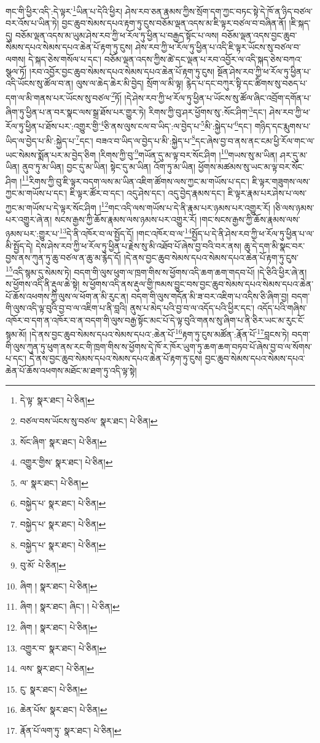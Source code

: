 གང་གི་ཕྱིར་འདི་:དེ་ལྟར་\footnote{དེ་ལྟ་  སྣར་ཐང་།  པེ་ཅིན། }ཡིན་པ་དེའི་ཕྱིར། ཤེས་རབ་ཅན་རྣམས་ཀྱིས་སྲོག་དག་ཀྱང་བཏང་སྟེ་དེ་ཁོ་ན་ཉིད་བཙལ་བར་འོས་པ་ཡིན་ཏེ། བྱང་ཆུབ་སེམས་དཔའ་རྟག་ཏུ་ངུས་བཅོམ་ལྡན་འདས་མ་ཇི་ལྟར་བཙལ་བ་བཞིན་ནོ། །ཇི་སྐད་དུ། བཅོམ་ལྡན་འདས་མ་ཡུམ་ཤེས་རབ་ཀྱི་ཕ་རོལ་ཏུ་ཕྱིན་པ་བརྒྱད་སྟོང་པ་ལས། བཅོམ་ལྡན་འདས་བྱང་ཆུབ་སེམས་དཔའ་སེམས་དཔའ་ཆེན་པོ་རྟག་ཏུ་ངུས། ཤེས་རབ་ཀྱི་ཕ་རོལ་ཏུ་ཕྱིན་པ་འདི་ཇི་ལྟར་ཡོངས་སུ་བཙལ་བ་ལགས། དེ་སྐད་ཅེས་གསོལ་པ་དང་། བཅོམ་ལྡན་འདས་ཀྱིས་ཚེ་དང་ལྡན་པ་རབ་འབྱོར་ལ་འདི་སྐད་ཅེས་བཀའ་སྩལ་ཏོ། །རབ་འབྱོར་བྱང་ཆུབ་སེམས་དཔའ་སེམས་དཔའ་ཆེན་པོ་རྟག་ཏུ་ངུས། སྔོན་ཤེས་རབ་ཀྱི་ཕ་རོལ་ཏུ་ཕྱིན་པ་འདི་ཡོངས་སུ་ཚོལ་བ་ན། ལུས་ལ་ཆེད་ཆེར་མི་བྱེད། སྲོག་ལ་མི་ལྟ། རྙེད་པ་དང་བཀུར་སྟི་དང་ཚིགས་སུ་བཅད་པ་དག་ལ་མི་གནས་པར་ཡོངས་སུ་བཙལ་\footnote{བཙལ་བས་ཡོངས་སུ་བཙལ་  སྣར་ཐང་།  པེ་ཅིན། }ཏོ། །དེ་ཤེས་རབ་ཀྱི་ཕ་རོལ་ཏུ་ཕྱིན་པ་ཡོངས་སུ་ཚོལ་ཞིང་འབྲོག་དགོན་པ་ཞིག་ཏུ་ཕྱིན་པ་ན་བར་སྣང་ལས་སྒྲ་ཐོས་པར་གྱུར་ཏེ། རིགས་ཀྱི་བུ་ཤར་ཕྱོགས་སུ་:སོང་ཤིག་\footnote{སོང་ཞིག་  སྣར་ཐང་།  པེ་ཅིན། }དང་། ཤེས་རབ་ཀྱི་ཕ་རོལ་ཏུ་ཕྱིན་པ་ཐོས་པར་:འགྱུར་གྱི་\footnote{འགྱུར་གྱིས་  སྣར་ཐང་།  པེ་ཅིན། }ཅི་ནས་ལུས་ངལ་བ་ཡིད་:ལ་བྱེད་པ་\footnote{ལ་  སྣར་ཐང་།  པེ་ཅིན། }མི་:སྐྱེད་པ་\footnote{བསྐྱེད་པ་  སྣར་ཐང་།  པེ་ཅིན། }དང་། གཉིད་དང་རྨུགས་པ་ཡིད་ལ་བྱེད་པ་མི་:སྐྱེད་པ་\footnote{བསྐྱེད་པ་  སྣར་ཐང་།  པེ་ཅིན། }དང་། བཟའ་བ་ཡིད་ལ་བྱེད་པ་མི་:སྐྱེད་པ་\footnote{བསྐྱེད་པ་  སྣར་ཐང་།  པེ་ཅིན། }དང་ཞེས་བྱ་བ་ནས་ནང་ངམ་ཕྱི་རོལ་གང་ལ་ཡང་སེམས་སྨོན་པར་མ་བྱེད་ཅིག །རིགས་ཀྱི་བུ་\footnote{བུ་མོ་  པེ་ཅིན། }གཡོན་དུ་མ་ལྟ་བར་སོང་ཤིག །\footnote{ཞིག །  སྣར་ཐང་།  པེ་ཅིན། }གཡས་སུ་མ་ཡིན། ཤར་དུ་མ་ཡིན། ནུབ་ཏུ་མ་ཡིན། བྱང་དུ་མ་ཡིན། སྟེང་དུ་མ་ཡིན། འོག་ཏུ་མ་ཡིན། ཕྱོགས་མཚམས་སུ་ཡང་མ་ལྟ་བར་སོང་ཤིག །\footnote{ཞིག །  སྣར་ཐང་། ཞིང་། །  པེ་ཅིན། }རིགས་ཀྱི་བུ་ཇི་ལྟར་བདག་ལས་མ་ཡིན་འཇིག་ཚོགས་ལས་ཀྱང་མ་གཡོས་པ་དང་། ཇི་ལྟར་གཟུགས་ལས་ཀྱང་མ་གཡོས་པ་དང་། ཇི་ལྟར་ཚོར་བ་དང་། འདུ་ཤེས་དང་། འདུ་བྱེད་རྣམས་དང་། ཇི་ལྟར་རྣམ་པར་ཤེས་པ་ལས་ཀྱང་མ་གཡོས་པ་དེ་ལྟར་སོང་ཤིག །\footnote{ཞིག །  སྣར་ཐང་།  པེ་ཅིན། }གང་འདི་ལས་གཡོས་པ་དེ་ནི་རྣམ་པར་ཉམས་པར་འགྱུར་རོ། །ཅི་ལས་ཉམས་པར་འགྱུར་ཞེ་ན། སངས་རྒྱས་ཀྱི་ཆོས་རྣམས་ལས་ཉམས་པར་འགྱུར་རོ། །གང་སངས་རྒྱས་ཀྱི་ཆོས་རྣམས་ལས་ཉམས་པར་:གྱུར་པ་\footnote{འགྱུར་བ་  སྣར་ཐང་།  པེ་ཅིན། }དེ་ནི་འཁོར་བ་ལ་སྤྱོད་དོ། །གང་འཁོར་བ་ལ་\footnote{ལས་  སྣར་ཐང་།  པེ་ཅིན། }སྤྱོད་པ་དེ་ནི་ཤེས་རབ་ཀྱི་ཕ་རོལ་ཏུ་ཕྱིན་པ་ལ་མི་སྤྱོད་དེ། དེས་ཤེས་རབ་ཀྱི་ཕ་རོལ་ཏུ་ཕྱིན་པ་རྗེས་སུ་མི་འཐོབ་པོ་ཞེས་བྱ་བའི་བར་ནས། ཆུ་དེ་དག་མི་སྣང་བར་བྱས་ནས་ཀུན་ཏུ་ཆུ་བཙལ་ན་ཆུ་མ་རྙེད་དོ། །དེ་ནས་བྱང་ཆུབ་སེམས་དཔའ་སེམས་དཔའ་ཆེན་པོ་རྟག་ཏུ་ངུས་\footnote{ངུ་  སྣར་ཐང་།  པེ་ཅིན། }འདི་སྙམ་དུ་སེམས་ཏེ། བདག་གི་ལུས་ཕུག་ལ་ཁྲག་གིས་ས་ཕྱོགས་འདི་ཆག་ཆག་གདབ་པོ། །དེ་ཅིའི་ཕྱིར་ཞེ་ན། ས་ཕྱོགས་འདི་ནི་རྡུལ་ཆེ་སྟེ། ས་ཕྱོགས་འདི་ནས་རྡུལ་གྱི་ཁམས་བྱུང་བས་བྱང་ཆུབ་སེམས་དཔའ་སེམས་དཔའ་ཆེན་པོ་ཆོས་འཕགས་ཀྱི་ལུས་ལ་ཕོག་ན་མི་རུང་ན། བདག་གི་ལུས་གདོན་མི་ཟ་བར་འཇིག་པ་འདིས་ཅི་ཞིག་བྱ། བདག་གི་ལུས་འདི་ལྟ་བུའི་བྱ་བ་ལ་འཇིག་པ་ནི་བླའི། ནུས་པ་མེད་པའི་བྱ་བ་ལ་འདོད་པའི་ཕྱིར་དང་། འདོད་པའི་གཞིས་འཁོར་བ་དག་ན་འཁོར་བ་ན་བདག་གི་ལུས་བརྒྱ་སྟོང་མང་པོ་དེ་ལྟ་བུའི་གནས་སུ་ཞིག་པ་ནི་ཅིར་ཡང་མ་རུང་ངོ་སྙམ་མོ། །དེ་ནས་བྱང་ཆུབ་སེམས་དཔའ་སེམས་དཔའ་:ཆེན་པོ་\footnote{ཆེན་པོས་  སྣར་ཐང་།  པེ་ཅིན། }རྟག་ཏུ་ངུས་མཚོན་:རྣོན་པོ་\footnote{རྣོན་པོ་ལག་ཏུ་  སྣར་ཐང་།  པེ་ཅིན། }བླངས་ཏེ། བདག་གི་ལུས་ཀུན་ཏུ་ཕུག་ནས་རང་གི་ཁྲག་གིས་ས་ཕྱོགས་དེ་ཁོ་ར་ཁོར་ཡུག་ཏུ་ཆག་ཆག་བཏབ་པོ་ཞེས་བྱ་བ་ལ་སོགས་པ་དང་། དེ་ནས་བྱང་ཆུབ་སེམས་དཔའ་སེམས་དཔའ་ཆེན་པོ་རྟག་ཏུ་ངུས། བྱང་ཆུབ་སེམས་དཔའ་སེམས་དཔའ་ཆེན་པོ་ཆོས་འཕགས་མཐོང་མ་ཐག་ཏུ་འདི་ལྟ་སྟེ། 
